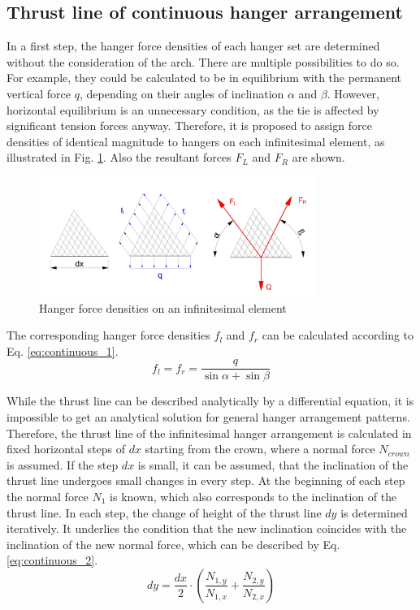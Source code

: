 \subsection{Thrust line of continuous hanger arrangement}\label{app:continuous}
In a first step, the hanger force densities of each hanger set are determined without the consideration of the arch. There are multiple possibilities to do so. For example, they could be calculated to be in equilibrium with the permanent vertical force $q$, depending on their angles of inclination $\alpha$ and $\beta$. However, horizontal equilibrium is an unnecessary condition, as the tie is affected by significant tension forces anyway. Therefore, it is proposed to assign force densities of identical magnitude to hangers on each infinitesimal element, as illustrated in Fig. \ref{fig:continuous_1}. Also the resultant forces $F_L$ and $F_R$ are shown.
\begin{figure}[H]
    \centering
    \includegraphics[width=0.8\textwidth]{overleaf/Appendix/Pictures/continuous_thrust_line_1.PNG}
    \caption{Hanger force densities on an infinitesimal element}
    \label{fig:continuous_1}
\end{figure}

The corresponding hanger force densities $f_l$ and $f_r$ can be calculated according to Eq. \eqref{eq:continuous_1}.
\begin{equation}
    f_l=f_r=\frac{q}{\sin{\alpha}+ \sin{\beta}}
    \label{eq:continuous_1}
\end{equation}

While the thrust line can be described analytically by a differential equation, it is impossible to get an analytical solution for general hanger arrangement patterns. Therefore, the thrust line of the infinitesimal hanger arrangement is calculated in fixed horizontal steps of $dx$ starting from the crown, where a normal force $N_{crown}$ is assumed. If the step $dx$ is small, it can be assumed, that the inclination of the thrust line undergoes small changes in every step. At the beginning of each step the normal force $N_1$ is known, which also corresponds to the inclination of the thrust line. In each step, the change of height of the thrust line $dy$ is determined iteratively. It underlies the condition that the new inclination coincides with the inclination of the new normal force, which can be described by Eq. \ref{eq:continuous_2}.
\begin{equation}
    dy = \frac{dx}{2} \cdot \left(\frac{N_{1,y}}{N_{1,x}} + \frac{N_{2,y}}{N_{2,x}} \right)
    \label{eq:continuous_2}
\end{equation}

